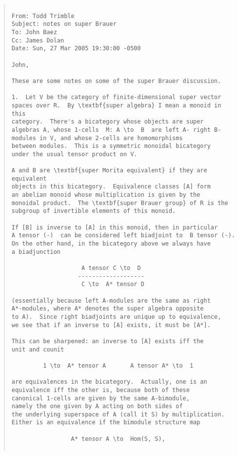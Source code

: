 \begin{quote}

\begin{verbatim}

From: Todd Trimble 
Subject: notes on super Brauer 
To: John Baez 
Cc: James Dolan 
Date: Sun, 27 Mar 2005 19:30:00 -0500 

John, 

These are some notes on some of the super Brauer discussion.  

1.  Let V be the category of finite-dimensional super vector 
spaces over R.  By \textbf{super algebra} I mean a monoid in this 
category.  There's a bicategory whose objects are super 
algebras A, whose 1-cells  M: A \to  B  are left A- right B-
modules in V, and whose 2-cells are homomorphisms
between modules.  This is a symmetric monoidal bicategory 
under the usual tensor product on V.  

A and B are \textbf{super Morita equivalent} if they are equivalent 
objects in this bicategory.  Equivalence classes [A] form 
an abelian monoid whose multiplication is given by the 
monoidal product.  The \textbf{super Brauer group} of R is the 
subgroup of invertible elements of this monoid. 

If [B] is inverse to [A] in this monoid, then in particular 
A tensor (-)  can be considered left biadjoint to  B tensor (-). 
On the other hand, in the bicategory above we always have 
a biadjunction 

                    A tensor C \to  D 
                   -------------------
                    C \to  A* tensor D

(essentially because left A-modules are the same as right 
A*-modules, where A* denotes the super algebra opposite 
to A).  Since right biadjoints are unique up to equivalence, 
we see that if an inverse to [A] exists, it must be [A*]. 

This can be sharpened: an inverse to [A] exists iff the 
unit and counit 

         1 \to  A* tensor A       A tensor A* \to  1

are equivalences in the bicategory.  Actually, one is an 
equivalence iff the other is, because both of these 
canonical 1-cells are given by the same A-bimodule,  
namely the one given by A acting on both sides of 
the underlying superspace of A (call it S) by multiplication.  
Either is an equivalence if the bimodule structure map 

                 A* tensor A \to  Hom(S, S),    


\end{verbatim}
\end{quote}
